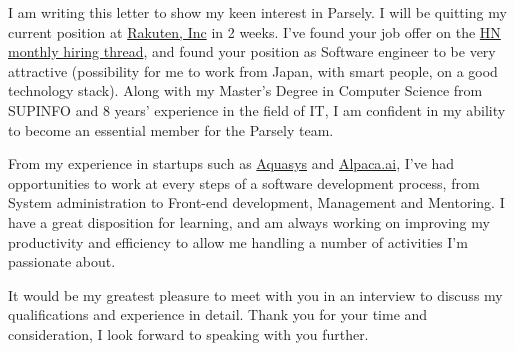 \documentclass[10pt,stdletter,dateno,sigleft]{newlfm} %
\begin{document}
\begin{newlfm}


I am writing this letter to show my keen interest in Parsely. I will be
quitting my current position at \href{http://global.rakuten.com/corp/}{Rakuten, Inc}
in 2 weeks. I've found your job offer
on the \href{https://news.ycombinator.com/item?id=11012044}{HN monthly hiring thread},
and found your position as Software engineer to be very attractive (possibility
for me to work from Japan, with smart people, on a good technology stack).  Along with my Master's
Degree in Computer Science from SUPINFO and 8 years' experience in the field of IT, I am 
confident in my ability to become an essential member for the Parsely team.

From my experience in startups such as
\href{http://www.aquasys.co.jp/}{Aquasys} and
\href{https://www.alpaca.ai/}{Alpaca.ai}, I've had opportunities to work at
every steps of a software development process, from System administration to
Front-end development, Management and Mentoring. I have a great disposition for
learning, and am always working on improving my productivity and efficiency to
allow me handling a number of activities I'm passionate about.

It would be my greatest pleasure to meet with you in an interview to discuss my
qualifications and experience in detail.  Thank you for your time and
consideration, I look forward to speaking with you further.


\end{newlfm}
\end{document}
